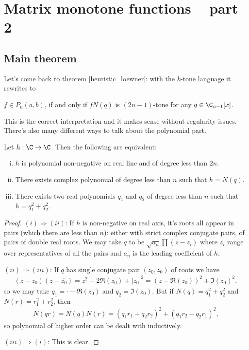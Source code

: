 \chapter{Matrix monotone functions -- part 2}

\section{Main theorem}

Let's come back to theorem \ref{heuristic_loewner}: with the $k$-tone language it rewrites to

\begin{lause}\label{main_theorem}
	$f \in P_{n}(a, b)$, if and only if $f N(q)$ is $(2 n - 1)$-tone for any $q \in \C_{n - 1}[x]$.
\end{lause}

This is the correct interpretation and it makes sense without regularity issues. There's also many different ways to talk about the polynomial part.
\begin{lem}\label{polynomial_lemma}
	Let $h : \C \to \C$. Then the following are equivalent:
	\begin{enumerate}[(i)]
		\item $h$ is polynomial non-negative on real line and of degree less than $2 n$.
		\item There exists complex polynomial of degree less than $n$ such that $h = N(q)$.
		\item There exists two real polynomials $q_{1}$ and $q_{2}$ of degree less than $n$ such that $h = q_{1}^2 + q_{2}^2$.
	\end{enumerate}
\end{lem}
\begin{proof}
	$(i) \Rightarrow (ii)$: If $h$ is non-negative on real axis, it's roots all appear in pairs (which there are less than $n$): either with strict complex conjugate pairs, of pairs of double real roots. We may take $q$ to be $\sqrt{a_{n}}\prod (z - z_{i})$ where $z_{i}$ range over representatives of all the pairs and $a_{n}$ is the leading coefficient of $h$.

	$(ii) \Rightarrow (iii)$: If $q$ has single conjugate pair $(z_{0}, \overline{z_{0}})$ of roots we have
	\begin{align*}
		(z - z_{0}) (z - \overline{z_{0}}) = z^2 - 2 \Re(z_{0}) + |z_{0}|^2 = (z - \Re(z_{0}))^2 + \Im(z_{0})^2,
	\end{align*}
	so we may take $q_{1} = \cdot - \Re(z_{0})$ and $q_{2} = \Im(z_{0})$. But if $ N(q) = q_{1}^2 + q_{2}^2$ and $ N(r) = r_{1}^2 + r_{2}^2$, then
	\begin{align*}
		N(q r) = N(q) N(r) = (q_{1} r_{1} + q_{2} r_{2})^2 + (q_{1} r_{2} - q_{2} r_{1})^2,
	\end{align*}
	so polynomial of higher order can be dealt with inductively.

	$(iii) \Rightarrow (i)$: This is clear.
\end{proof}

